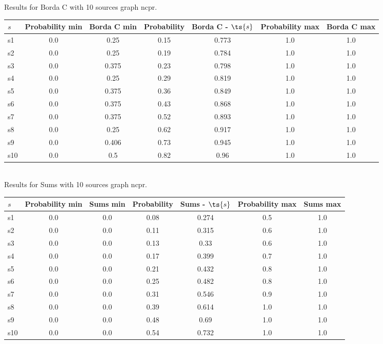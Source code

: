 \documentclass{article}
\begin{document}
\noindent Results for Borda C with 10 sources graph ncpr.

\noindent\begin{tabular}{|l|c|c|c|c|c|c|}
\hline
$s$& Probability min & Borda C min & Probability & Borda C - $\ts{s}$ & Probability max & Borda C max\\
\hline
s1 &0.0 & 0.25 & 0.15 & 0.773 & 1.0 & 1.0\\
\hline
s2 &0.0 & 0.25 & 0.19 & 0.784 & 1.0 & 1.0\\
\hline
s3 &0.0 & 0.375 & 0.23 & 0.798 & 1.0 & 1.0\\
\hline
s4 &0.0 & 0.25 & 0.29 & 0.819 & 1.0 & 1.0\\
\hline
s5 &0.0 & 0.375 & 0.36 & 0.849 & 1.0 & 1.0\\
\hline
s6 &0.0 & 0.375 & 0.43 & 0.868 & 1.0 & 1.0\\
\hline
s7 &0.0 & 0.375 & 0.52 & 0.893 & 1.0 & 1.0\\
\hline
s8 &0.0 & 0.25 & 0.62 & 0.917 & 1.0 & 1.0\\
\hline
s9 &0.0 & 0.406 & 0.73 & 0.945 & 1.0 & 1.0\\
\hline
s10 &0.0 & 0.5 & 0.82 & 0.96 & 1.0 & 1.0\\
\hline
\end{tabular}\\

\noindent Results for Sums with 10 sources graph ncpr.

\noindent\begin{tabular}{|l|c|c|c|c|c|c|}
\hline
$s$& Probability min & Sums min & Probability & Sums - $\ts{s}$ & Probability max & Sums max\\
\hline
s1 &0.0 & 0.0 & 0.08 & 0.274 & 0.5 & 1.0\\
\hline
s2 &0.0 & 0.0 & 0.11 & 0.315 & 0.6 & 1.0\\
\hline
s3 &0.0 & 0.0 & 0.13 & 0.33 & 0.6 & 1.0\\
\hline
s4 &0.0 & 0.0 & 0.17 & 0.399 & 0.7 & 1.0\\
\hline
s5 &0.0 & 0.0 & 0.21 & 0.432 & 0.8 & 1.0\\
\hline
s6 &0.0 & 0.0 & 0.25 & 0.482 & 0.8 & 1.0\\
\hline
s7 &0.0 & 0.0 & 0.31 & 0.546 & 0.9 & 1.0\\
\hline
s8 &0.0 & 0.0 & 0.39 & 0.614 & 1.0 & 1.0\\
\hline
s9 &0.0 & 0.0 & 0.48 & 0.69 & 1.0 & 1.0\\
\hline
s10 &0.0 & 0.0 & 0.54 & 0.732 & 1.0 & 1.0\\
\hline
\end{tabular}\\
\end{document}

